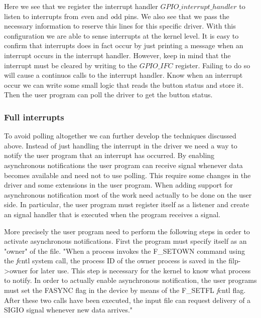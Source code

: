 Here we see that we register the interrupt handler $GPIO\_interrupt\_handler$ to listen to interrupts from {\emph even} and {\emph odd} pins. We also see that we pass the necessary information to reserve this lines for this specific driver. With this configuration we are able to sense interrupts at the kernel level. It is easy to confirm that interrupts does in fact occur by just printing a message when an interrupt occurs in the interrupt handler. However, keep in mind that the interrupt must be cleared by writing to the $GPIO\_IFC$ register. Failing to do so will cause a continuos calls to the interrupt handler. Know when an interrupt occur we can write some small logic that reads the button status and store it. Then the user program can poll the driver to get the button status. 


\subsubsection{Full interrupts}
To avoid polling altogether we can further develop the techniques discussed above. Instead of just handling the interrupt in the driver we need a way to notify the user program that an interrupt has occurred. By enabling asynchronous notifications the user program can receive signal whenever data becomes available and need not to use polling. This require some changes in the driver and some extensions in the user program. When adding support for asynchronous notification most of the work need actually to be done on the user side. In particular, the user program must register itself as a listener and create an signal handler that is executed when the program receives a signal. 

More precisely the user program need to perform the following steps in order to activate asynchronous notifications. First the program must specify itself as an "owner" of the file. "When a process invokes the F\_SETOWN command using the {\emph fcntl} system call, the process ID of the owner process is saved in the filp->owner for later use. This step is necessary for the kernel to know what process to notify. In order to actually enable asynchronous notification, the user programs must set the FASYNC flag in the device by means of the F\_SETFL {\emph fcntl} flag. After these two calls have been executed, the input file can request delivery of a SIGIO signal whenever new data arrives."

